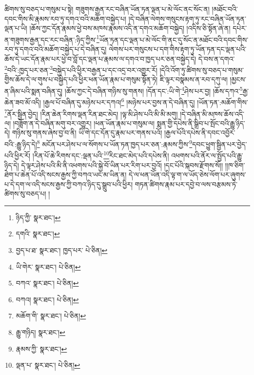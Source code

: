 ཚིགས་སུ་བཅད་པ་གསུམ་པ་སྟེ། གཟུགས་རྒྱན་རང་བཞིན་ཡོན་ཏན་ལྡན་པ་མེ་ལོང་ནང་སོང་ན། །མཐོང་བའི་དབང་གིས་མི་རྣམས་རབ་ཏུ་དགའ་བའི་མཆོག་བསྐྱེད་པ། །དེ་བཞིན་ལེགས་གསུངས་རྟག་ཏུ་རང་བཞིན་ཡོན་ཏན་ལྡན་པ་ཡི། །ཆོས་ཀྱང་དོན་རྣམས་ཕྱེ་བས་མཁས་རྣམས་འདི་ན་དགའ་མཆོག་བསྐྱེད། །འདིས་ཅི་སྟོན་ཞེ་ན། དཔེར་ན་གཟུགས་རྒྱན་དང་རང་བཞིན་:ཉིད་ཀྱིས་\footnote{ཉིད་ཀྱི་  སྣར་ཐང་། }ཡོན་ཏན་དང་ལྡན་པ་མེ་ལོང་གི་ནང་དུ་སོང་ན་མཐོང་བའི་དབང་གིས་རབ་ཏུ་དགའ་བའི་མཆོག་བསྐྱེད་པ་དེ་བཞིན་དུ། ལེགས་པར་གསུངས་པ་དག་གིས་རྟག་ཏུ་ཡོན་ཏན་དང་ལྡན་པའི་ཆོས་དེ་ཡང་དོན་རྣམ་པར་ཕྱེ་བ་བློ་དང་ལྡན་པ་རྣམས་ལ་དགའ་བ་ཁྱད་པར་ཅན་བསྐྱེད་དེ། དེ་བས་ན་དགའ་\footnote{དགའི་  སྣར་ཐང་། }བའི་:ཁྱད་པར་ཅན་\footnote{བྱད་པ་ཐ་  སྣར་ཐང་། ཁྱད་པར་  པེ་ཅིན། }བསྐྱེད་པའི་ཕྱིར་བརྒྱན་པ་དང་འདྲ་བར་འགྱུར་རོ། །དེའི་འོག་ཏུ་ཚིགས་སུ་བཅད་པ་གསུམ་གྱིས་ཆོས་དེ་ལ་གུས་པ་བསྐྱེད་པའི་ཕྱིར་ཕན་ཡོན་རྣམ་པ་གསུམ་སྟོན་ཏེ། ཇི་ལྟར་བསྣམས་ན་རབ་དཀུ་ལ། །མྱངས་ན་ཞིམ་པའི་སྨན་བཞིན་དུ། །ཆོས་ཀྱང་དེ་བཞིན་གཉིས་སུ་གནས། །དོན་དང་:ཡི་གེ་\footnote{ཡི་གེར་  སྣར་ཐང་།  པེ་ཅིན། }ཤེས་པར་བྱ། །ཆོས་དཀའ་\footnote{བཀའ་  སྣར་ཐང་།  པེ་ཅིན། }རྒྱ་ཆེན་ཟབ་མོ་འདི། །རྒྱལ་པོ་བཞིན་དུ་མཉེས་པར་དཀའ།\footnote{བཀའ།  སྣར་ཐང་།  པེ་ཅིན། } །མཉེས་པར་བྱས་ན་དེ་བཞིན་དུ། །ཡོན་ཏན་:མཆོག་གིས་\footnote{མཆོག་གི་  སྣར་ཐང་།  པེ་ཅིན། }ནོར་སྦྱིན་བྱེད། །རིན་ཆེན་རིགས་ལྡན་རིན་ཐང་མེད། །ལྟ་མི་ཤེས་པའི་མི་མི་མགུ། །དེ་བཞིན་མི་མཁས་ཆོས་འདི་ལ། །བཟློག་ན་དེ་བཞིན་མགུ་བར་འགྱུར། །ཕན་ཡོན་རྣམ་པ་གསུམ་ལ། སྨན་གྱི་དཔེས་ནི་སྒྲིབ་པ་སྤོང་བའི་རྒྱུ་ཉིད་དེ། གཉིས་སུ་གནས་ཞེས་བྱ་བ་ནི། ཡི་གེ་དང་དོན་དུ་རྣམ་པར་གནས་པའོ། །རྒྱལ་པོའི་དཔེས་ནི་དབང་འབྱོར་བའི་:རྒྱུ་ཉིད་དེ།\footnote{རྒྱུ་གཉིད།  སྣར་ཐང་། } མངོན་པར་ཤེས་པ་ལ་སོགས་པ་ཡོན་ཏན་ཁྱད་པར་ཅན་:རྣམས་ཀྱིས་\footnote{རྣམས་ཀྱི་  སྣར་ཐང་། }དབང་ཕྱུག་སྦྱིན་པར་བྱེད་པའི་ཕྱིར་རོ། །རིན་པོ་ཆེ་རིགས་དང་:ལྡན་པའི་\footnote{ལྡན་པ་  སྣར་ཐང་།  པེ་ཅིན། }རིང་ཐང་མེད་པའི་དཔེས་ནི། འཕགས་པའི་ནོར་ལ་སྤྱོད་པའི་རྒྱུ་ཉིད་དེ། དེ་ལྟར་ཤེས་པའི་མི་ནི་འཕགས་པའི་སྐྱེ་བོ་ཡིན་པར་རིག་པར་བྱའོ། །དང་པོའི་སྐབས་རྫོགས་སོ།། །།ཁ་ཅིག་ཐེག་པ་ཆེན་པོ་འདི་སངས་རྒྱས་ཀྱི་བཀའ་ཡང་མ་ཡིན་ན། དེ་ལ་ཕན་ཡོན་འདི་ལྟ་ག་ལ་ཡོད་ཅེས་ལོག་པར་ཞུགས་པ་དེ་དག་ལ་འདི་སངས་རྒྱས་ཀྱི་བཀའ་ཉིད་དུ་སྒྲུབ་པའི་ཕྱིར། གཏན་ཚིགས་རྣམ་པར་དབྱེ་བ་ལས་བརྩམས་ཏེ་ཚིགས་སུ་བཅད་པ། །
